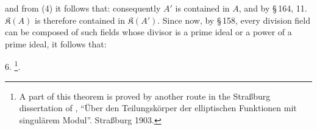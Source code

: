 
and from (4) it follows that:
consequently $A'$ is contained in $A$, and by \S\,164, 11. $\mathfrak{K}(A)$ is therefore contained in $\mathfrak{K}(A')$. Since now, by \S\,158, every division field can be composed of such fields whose divisor is a prime ideal or a power of a prime ideal, it follows that:

6. \footnote{A part of this theorem is proved by another route in the Stra\ss burg dissertation of , ``\"Uber den Teilungsk\"orper der elliptischen Funktionen mit singul\"arem Modul''. Stra\ss burg 1903.}.
